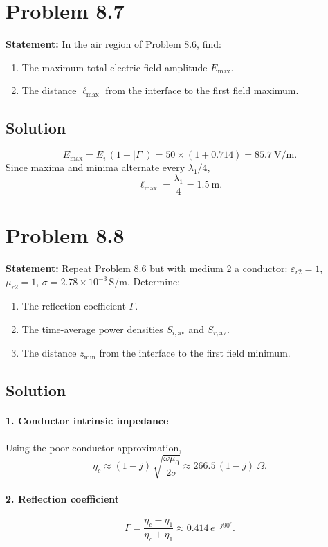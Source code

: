 \section*{Problem 8.7}
\textbf{Statement:} In the air region of Problem 8.6, find:
\begin{enumerate}
  \item The maximum total electric field amplitude $E_{\max}$.
  \item The distance $\ell_{\max}$ from the interface to the first field maximum.
\end{enumerate}

\subsection*{Solution}
\[
E_{\max} = E_i \,(1 + |\Gamma|)
= 50 \times (1 + 0.714)
= 85.7\ \mathrm{V/m}.
\]
Since maxima and minima alternate every $\lambda_1/4$,
\[
\ell_{\max} = \frac{\lambda_1}{4} = 1.5\ \mathrm{m}.
\]

\section*{Problem 8.8}
\textbf{Statement:} Repeat Problem 8.6 but with medium 2 a conductor: $\varepsilon_{r2}=1$, $\mu_{r2}=1$, $\sigma = 2.78\times10^{-3}\,$S/m. Determine:
\begin{enumerate}
  \item The reflection coefficient $\Gamma$.
  \item The time-average power densities $S_{i,\mathrm{av}}$ and $S_{r,\mathrm{av}}$.
  \item The distance $z_{\min}$ from the interface to the first field minimum.
\end{enumerate}

\subsection*{Solution}

\paragraph{1. Conductor intrinsic impedance}
Using the poor-conductor approximation,
\[
\eta_c \approx (1 - j)\,\sqrt{\frac{\omega \mu_0}{2\sigma}}
\approx 266.5\,(1 - j)\ \Omega.
\]

\paragraph{2. Reflection coefficient}
\[
\Gamma
= \frac{\eta_c - \eta_1}{\eta_c + \eta_1}
\approx 0.414\,e^{-j90^\circ}.
\]

